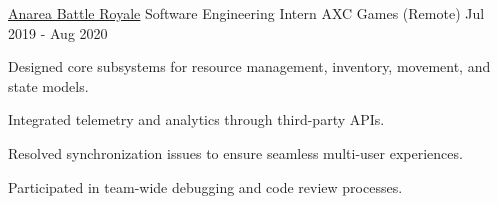 \begin{cventries}
  \cventry
    {\href{https://wizardcell.com/about/anarea}{\underline{Anarea Battle Royale}}}
    {Software Engineering Intern}
    {AXC Games (Remote)}
    {Jul 2019 - Aug 2020}
    {
      \begin{cvitems}
        \item {Designed core subsystems for resource management, inventory, movement, and state models.}
        \item {Integrated telemetry and analytics through third-party APIs.}
        \item {Resolved synchronization issues to ensure seamless multi-user experiences.}
        \item {Participated in team-wide debugging and code review processes.}
      \end{cvitems}
    }

\end{cventries}
